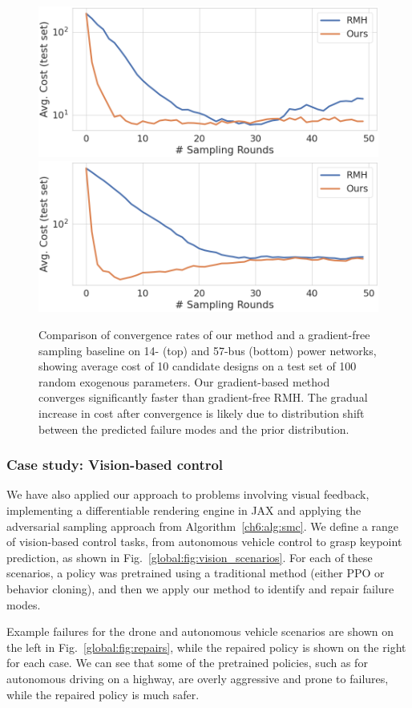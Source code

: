 \begin{figure}[tb]
    \centering
    \includegraphics[width=0.45\linewidth]{images/global_methods/14_bus_training_curves.png}
    \includegraphics[width=0.45\linewidth]{images/global_methods/57_bus_training_curves.png}
    \caption{Comparison of convergence rates of our method and a gradient-free sampling baseline on 14- (top) and 57-bus (bottom) power networks, showing average cost of 10 candidate designs on a test set of 100 random exogenous parameters. Our gradient-based method converges significantly faster than gradient-free RMH. The gradual increase in cost after convergence is likely due to distribution shift between the predicted failure modes and the prior distribution.}
    \label{global:fig:training_curves}
\end{figure}

\subsubsection{Case study: Vision-based control}

We have also applied our approach to problems involving visual feedback, implementing a differentiable rendering engine in JAX and applying the adversarial sampling approach from Algorithm~\ref{ch6:alg:smc}. We define a range of vision-based control tasks, from autonomous vehicle control to grasp keypoint prediction, as shown in Fig.~\ref{global:fig:vision_scenarios}. For each of these scenarios, a policy was pretrained using a traditional method (either PPO or behavior cloning), and then we apply our method to identify and repair failure modes.

Example failures for the drone and autonomous vehicle scenarios are shown on the left in Fig.~\ref{global:fig:repairs}, while the repaired policy is shown on the right for each case. We can see that some of the pretrained policies, such as for autonomous driving on a highway, are overly aggressive and prone to failures, while the repaired policy is much safer.

